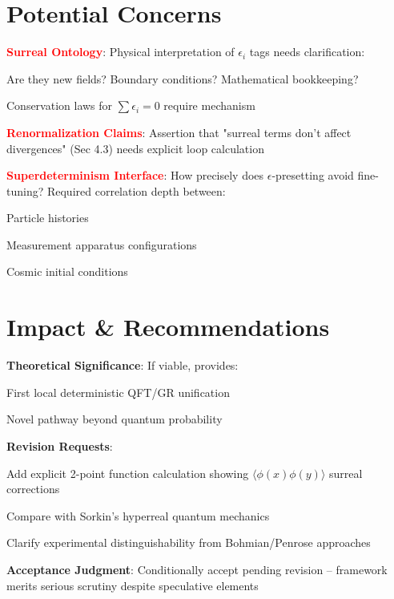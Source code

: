 \documentclass{article}
\begin{document}
\section{Potential Concerns}
\begin{compactitem}
\item \textcolor{red}{\textbf{Surreal Ontology}}: Physical interpretation of $\epsilon_i$ tags needs clarification:
\begin{compactitem}
\item Are they new fields? Boundary conditions? Mathematical bookkeeping?
\item Conservation laws for $\sum\epsilon_i=0$ require mechanism
\end{compactitem}

\item \textcolor{red}{\textbf{Renormalization Claims}}: Assertion that "surreal terms don't affect divergences" (Sec 4.3) needs explicit loop calculation

\item \textcolor{red}{\textbf{Superdeterminism Interface}}: How precisely does $\epsilon$-presetting avoid fine-tuning? Required correlation depth between:
\begin{compactitem}
\item Particle histories
\item Measurement apparatus configurations
\item Cosmic initial conditions
\end{compactitem}
\end{compactitem}

\section{Impact \& Recommendations}
\begin{compactitem}
\item \textbf{Theoretical Significance}: If viable, provides:
\begin{compactitem}
\item First local deterministic QFT/GR unification
\item Novel pathway beyond quantum probability
\end{compactitem}

\item \textbf{Revision Requests}:
\begin{compactenum}
\item Add explicit 2-point function calculation showing $\langle\phi(x)\phi(y)\rangle$ surreal corrections
\item Compare with Sorkin's hyperreal quantum mechanics
\item Clarify experimental distinguishability from Bohmian/Penrose approaches
\end{compactenum}

\item \textbf{Acceptance Judgment}: Conditionally accept pending revision – framework merits serious scrutiny despite speculative elements
\end{compactitem}
\end{document}
